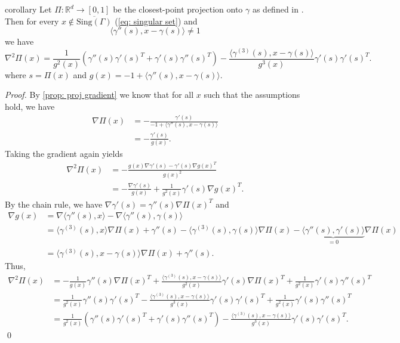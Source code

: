 \documentclass[11pt]{article}
\begin{document}
\begin{restatable}{corollary}{} \label{prop: proj hessian}
    Let $\Pi: \mathbb{R}^d \rightarrow [0, 1]$ be the closest-point projection onto $\gamma$ as defined in . Then for every $x \notin \overline{\text{Sing}(\Gamma)}$ (\cref{eq: singular set}) and 
    \[\langle\gamma''(s), x - \gamma(s)\rangle \neq 1\]
    we have
    \[\nabla^2\Pi(x) = \frac{1}{g^2(x)}\left(\gamma''(s)\gamma'(s)^T + \gamma'(s)\gamma''(s)^T\right)- \frac{\langle\gamma^{(3)}(s), x - \gamma(s)\rangle}{g^3(x)}\gamma'(s)\gamma'(s)^T.\]
    where $s = \Pi(x)$ and $g(x) = -1 + \langle\gamma''(s), x-\gamma(s)\rangle$.
\end{restatable}
\noindent \textit{Proof.} By \cref{prop: proj gradient} we know that for all $x$ such that the assumptions hold, we have
\begin{align}
    \nabla\Pi(x) &= -\frac{\gamma'(s)}{-1 + \langle\gamma''(s), x - \gamma(s)\rangle} \\
    &= -\frac{\gamma'(s)}{g(x)}.
\end{align}
Taking the gradient again yields
\begin{align}
    \nabla^2\Pi(x) &= -\frac{g(x)\nabla \gamma'(s) - \gamma'(s)\nabla g(x)^T}{g(x)^2} \\
    &= -\frac{\nabla \gamma'(s)}{g(x)} + \frac{1}{g^2(x)}\gamma'(s)\nabla g(x)^T.
\end{align}
By the chain rule, we have $\nabla\gamma'(s) = \gamma''(s)\nabla\Pi(x)^T$ and 
\begin{align}
    \nabla g(x) &= \nabla\langle\gamma''(s), x\rangle -\nabla\langle \gamma''(s), \gamma(s)\rangle \\
    &= \langle \gamma^{(3)}(s), x\rangle \nabla\Pi(x) + \gamma''(s) - \langle\gamma^{(3)}(s), \gamma(s)\rangle\nabla\Pi(x) - \underbrace{\langle\gamma''(s), \gamma'(s)\rangle}_{= 0}\nabla\Pi(x) \\
    &= \langle\gamma^{(3)}(s), x - \gamma(s)\rangle\nabla\Pi(x) + \gamma''(s).
\end{align}
Thus,
\begin{align*}
    \nabla^2\Pi(x) &= -\frac{1}{g(x)}\gamma''(s)\nabla\Pi(x)^T + \frac{\langle\gamma^{(3)}(s), x - \gamma(s)\rangle}{g^2(x)}\gamma'(s)\nabla\Pi(x)^T + \frac{1}{g^2(x)}\gamma'(s)\gamma''(s)^T \\
    &= \frac{1}{g^2(x)}\gamma''(s)\gamma'(s)^T - \frac{\langle\gamma^{(3)}(s), x - \gamma(s)\rangle}{g^3(x)}\gamma'(s)\gamma'(s)^T + \frac{1}{g^2(x)}\gamma'(s)\gamma''(s)^T \\
    &= \frac{1}{g^2(x)}\left(\gamma''(s)\gamma'(s)^T + \gamma'(s)\gamma''(s)^T\right)- \frac{\langle\gamma^{(3)}(s), x - \gamma(s)\rangle}{g^3(x)}\gamma'(s)\gamma'(s)^T.
\end{align*}
\qed{}
\end{document}
